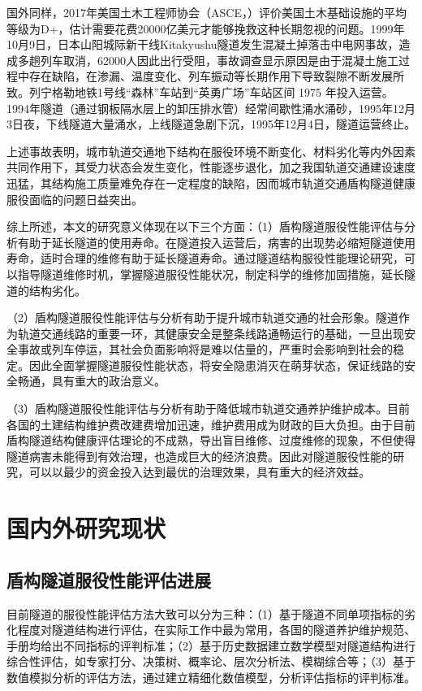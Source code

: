 国外同样，2017年美国土木工程师协会（ASCE，\citeyear{ASCE2017}）评价美国土木基础设施的平均等级为D+，估计需要花费20000亿美元才能够挽救这种长期忽视的问题。1999年10月9日，日本山阳城际新干线Kitakyushu隧道发生混凝土掉落击中电网事故，造成多趟列车取消，62000人因此出行受阻，事故调查显示原因是由于混凝土施工过程中存在缺陷，在渗漏、温度变化、列车振动等长期作用下导致裂隙不断发展所致。列宁格勒地铁1号线“森林”车站到“英勇广场”车站区间 1975 年投入运营。1994年隧道（通过钢板隔水层上的卸压排水管）经常间歇性涌水涌砂，1995年12月3日夜，下线隧道大量涌水，上线隧道急剧下沉，1995年12月4日，隧道运营终止。

上述事故表明，城市轨道交通地下结构在服役环境不断变化、材料劣化等内外因素共同作用下，其受力状态会发生变化，性能逐步退化，加之我国轨道交通建设速度迅猛，其结构施工质量难免存在一定程度的缺陷，因而城市轨道交通盾构隧道健康服役面临的问题日益突出。

综上所述，本文的研究意义体现在以下三个方面：（1）盾构隧道服役性能评估与分析有助于延长隧道的使用寿命。在隧道投入运营后，病害的出现势必缩短隧道使用寿命，适时合理的维修有助于延长隧道寿命。通过隧道结构服役性能理论研究，可以指导隧道维修时机，掌握隧道服役性能状况，制定科学的维修加固措施，延长隧道的结构劣化。

（2）盾构隧道服役性能评估与分析有助于提升城市轨道交通的社会形象。隧道作为轨道交通线路的重要一环，其健康安全是整条线路通畅运行的基础，一旦出现安全事故或列车停运，其社会负面影响将是难以估量的，严重时会影响到社会的稳定。因此全面掌握隧道服役性能状态，将安全隐患消灭在萌芽状态，保证线路的安全畅通，具有重大的政治意义。

（3）盾构隧道服役性能评估与分析有助于降低城市轨道交通养护维护成本。目前各国的土建结构维护费改建费增加迅速，维护费用成为财政的巨大负担。由于目前盾构隧道结构健康评估理论的不成熟，导出盲目维修、过度维修的现象，不但使得隧道病害未能得到有效治理，也造成巨大的经济浪费。因此对隧道服役性能的研究，可以以最少的资金投入达到最优的治理效果，具有重大的经济效益。

\section{国内外研究现状}
\subsection{盾构隧道服役性能评估进展}

目前隧道的服役性能评估方法大致可以分为三种：（1）基于隧道不同单项指标的劣化程度对隧道结构进行评估，在实际工作中最为常用，各国的隧道养护维护规范、手册均给出不同指标的评判标准；（2）基于历史数据建立数学模型对隧道结构进行综合性评估，如专家打分、决策树、概率论、层次分析法、模糊综合等；（3）基于数值模拟分析的评估方法，通过建立精细化数值模型，分析评估指标的评判标准。

